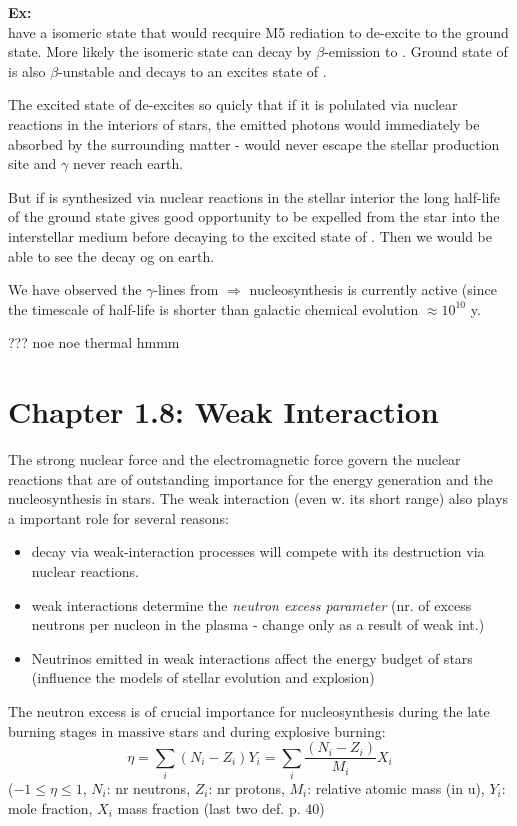 \documentclass[a4paper,12pt]{article}
\begin{document}
\textbf{Ex:} \\
 have a isomeric state that would recquire M5 rediation to de-excite to the ground state. More likely the isomeric state can decay by $\beta$-emission to . Ground state of  is also $\beta$-unstable and decays to an excites state of .

The excited state of  de-excites so quicly that if it is polulated via nuclear reactions in the interiors of stars, the emitted photons would immediately be absorbed by the surrounding matter - would never escape the stellar production site and $\gamma$ never reach earth.

But if  is synthesized via nuclear reactions in the stellar interior the long half-life of the ground state gives good opportunity to be expelled from the star into the interstellar medium before decaying to the excited state of . Then we would be able to see the decay og  on earth. 

We have observed the $\gamma$-lines from  $\Rightarrow$ nucleosynthesis is currently active (since the timescale of  half-life is shorter than galactic chemical evolution $\approx 10^{10}$ y.

???
noe noe thermal hmmm

\section*{Chapter 1.8: Weak Interaction}
The strong nuclear force and the electromagnetic force govern the nuclear reactions that are of outstanding importance for the energy generation and the nucleosynthesis in stars. The weak interaction (even w. its short range) also plays a important role for several reasons:
\begin{itemize}
\item decay via weak-interaction processes will compete with its destruction via nuclear reactions.
\item weak interactions determine the \textit{neutron excess parameter} (nr. of excess neutrons per nucleon in the plasma - change only as a result of weak int.)
\item Neutrinos emitted in weak interactions affect the energy budget of stars (influence the models of stellar evolution and explosion)
\end{itemize}

The neutron excess is of crucial importance for nucleosynthesis during the late burning stages in massive stars and during explosive burning:
\begin{equation}
\eta = \sum_i (N_i - Z_i)Y_i = \sum_i \frac{(N_i - Z_i)}{M_i}X_i
\end{equation}
($-1 \leq \eta \leq 1$, $N_i$: nr neutrons, $Z_i$: nr protons, $M_i$: relative atomic mass (in u), $Y_i$: mole fraction, $X_i$ mass fraction (last two def. p. 40)
\end{document}
